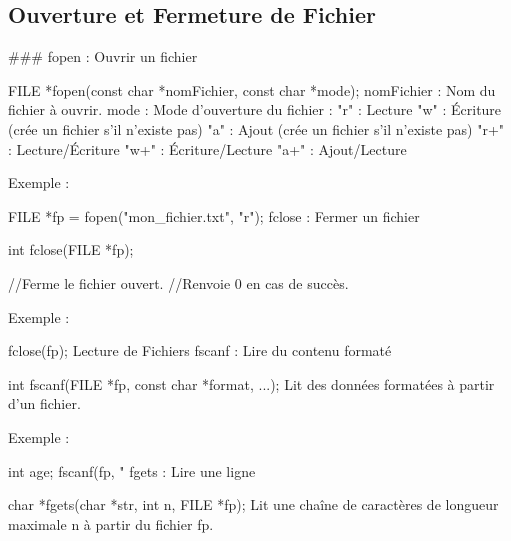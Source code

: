 \subsection*{Ouverture et Fermeture de Fichier}

\#\#\# {\ttfamily fopen} \+: Ouvrir un fichier 
\begin{DoxyCode}
FILE *fopen(const char *nomFichier, const char *mode);
nomFichier : Nom du fichier à ouvrir.
mode : Mode d'ouverture du fichier :
"r" : Lecture
"w" : Écriture (crée un fichier s'il n'existe pas)
"a" : Ajout (crée un fichier s'il n'existe pas)
"r+" : Lecture/Écriture
"w+" : Écriture/Lecture
"a+" : Ajout/Lecture
\end{DoxyCode}



\begin{DoxyItemize}
\item Exemple \+:
\end{DoxyItemize}


\begin{DoxyCode}
FILE *fp = fopen("mon\_fichier.txt", "r");
fclose : Fermer un fichier

int fclose(FILE *fp);

//Ferme le fichier ouvert.
//Renvoie 0 en cas de succès.
\end{DoxyCode}

\begin{DoxyItemize}
\item Exemple \+:
\end{DoxyItemize}


\begin{DoxyCode}
fclose(fp);
Lecture de Fichiers
fscanf : Lire du contenu formaté

int fscanf(FILE *fp, const char *format, ...);
Lit des données formatées à partir d'un fichier.
\end{DoxyCode}



\begin{DoxyItemize}
\item Exemple \+:
\end{DoxyItemize}


\begin{DoxyCode}
int age;
fscanf(fp, "%
fgets : Lire une ligne

char *fgets(char *str, int n, FILE *fp);
Lit une chaîne de caractères de longueur maximale n à partir du fichier fp.
\end{DoxyCode}



